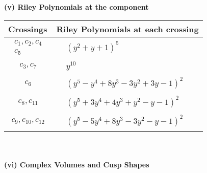 \documentclass[1p]{elsarticle_modified}
\theoremstyle{definition}
\begin{document}
\newpage\renewcommand{\arraystretch}{1}
\flushleft \textbf{(v) Riley Polynomials at the component}\newline \\
\begin{tabular}{m{50pt}|m{274pt}}
Crossings & \hspace{64pt}Riley Polynomials at each crossing \\
\hline $$\begin{aligned}c_{1},c_{2},c_{4}\\c_{5}\end{aligned}$$&$\begin{aligned}
&(y^2+y+1)^5
\end{aligned}$\\
\hline $$\begin{aligned}c_{3},c_{7}\end{aligned}$$&$\begin{aligned}
&y^{10}
\end{aligned}$\\
\hline $$\begin{aligned}c_{6}\end{aligned}$$&$\begin{aligned}
&(y^5- y^4+8 y^3-3 y^2+3 y-1)^2
\end{aligned}$\\
\hline $$\begin{aligned}c_{8},c_{11}\end{aligned}$$&$\begin{aligned}
&(y^5+3 y^4+4 y^3+y^2- y-1)^2
\end{aligned}$\\
\hline $$\begin{aligned}c_{9},c_{10},c_{12}\end{aligned}$$&$\begin{aligned}
&(y^5-5 y^4+8 y^3-3 y^2- y-1)^2
\end{aligned}$\\
\hline
\end{tabular}\\~\\
\newpage\flushleft \textbf{(vi) Complex Volumes and Cusp Shapes}
\end{document}
